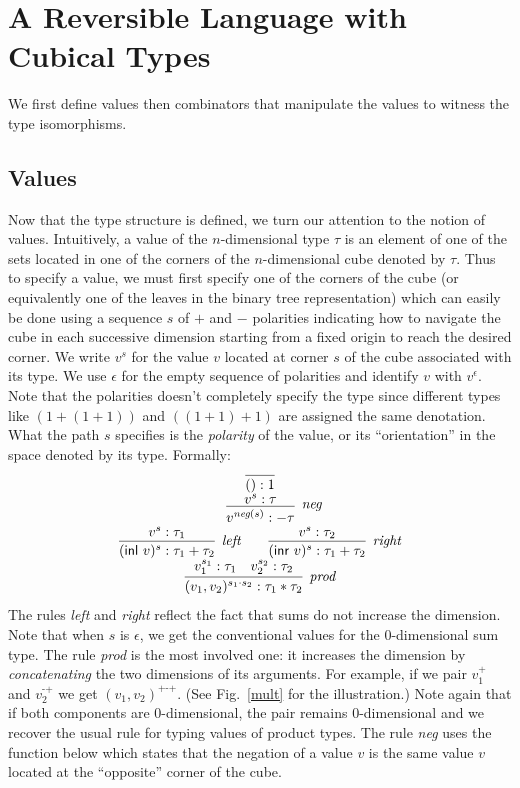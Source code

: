 \documentclass[authoryear,preprint]{sigplanconf}
\newcommand{\mm}{\texttt{-}}
\newcommand{\pp}{\texttt{+}}
\newcommand{\negp}[1]{\textit{neg}(#1)}
\newcommand{\inl}[1]{\textsf{inl}~#1}
\newcommand{\inr}[1]{\textsf{inr}~#1}
\begin{document}
\section{A Reversible Language with Cubical Types} 

We first define values then combinators that manipulate the values to witness
the type isomorphisms.

\subsection{Values} 

Now that the type structure is defined, we turn our attention to the notion
of values. Intuitively, a value of the $n$-dimensional type $\tau$ is an
element of one of the sets located in one of the corners of the
$n$-dimensional cube denoted by $\tau$. Thus to specify a value, we must
first specify one of the corners of the cube (or equivalently one of the
leaves in the binary tree representation) which can easily be done using a
sequence $s$ of $+$ and $-$ polarities indicating how to navigate the cube in
each successive dimension starting from a fixed origin to reach the desired
corner. We write $v^{s}$ for the value $v$ located at corner $s$ of the cube
associated with its type. We use $\epsilon$ for the empty sequence of
polarities and identify $v$ with $v^\epsilon$. Note that the polarities
doesn't completely specify the type since different types like $(1+(1+1))$
and $((1+1)+1)$ are assigned the same denotation. What the path $s$ specifies
is the \emph{polarity} of the value, or its ``orientation'' in the space
denoted by its type. Formally:
\[\begin{array}{c}
\infer{() : 1}{} \\
\qquad
\infer[\textit{neg}]{v^{\negp{s}} : - \tau}{v^s : \tau} 
\\
\infer[\textit{left}]{(\inl{v})^{s} : \tau_1 + \tau_2}{v^{s} : \tau_1}
\qquad
\infer[\textit{right}]{(\inr{v})^{s} : \tau_1 + \tau_2}{v^{s} : \tau_2} 
\\
\infer[\textit{prod}]{(v_1,v_2)^{s_1 \cdot s_2} : \tau_1 * \tau_2}
      {v_1^{s_1} : \tau_1 & v_2^{s_2} : \tau_2} 
\end{array}\]
The rules \textit{left} and \textit{right} reflect the fact that sums do not
increase the dimension. Note that when $s$ is $\epsilon$, we get the
conventional values for the 0-dimensional sum type. The rule \textit{prod} is
the most involved one: it increases the dimension by \emph{concatenating} the
two dimensions of its arguments. For example, if we pair $v_1^{\pp}$ and
$v_2^{\mm\pp}$ we get $(v_1,v_2)^{\pp\mm\pp}$. (See Fig.~\ref{mult} for the
illustration.) Note again that if both components are 0-dimensional, the pair
remains 0-dimensional and we recover the usual rule for typing values of
product types. The rule \textit{neg} uses the function below which states
that the negation of a value $v$ is the same value $v$ located at the
``opposite'' corner of the cube.
\end{document}
